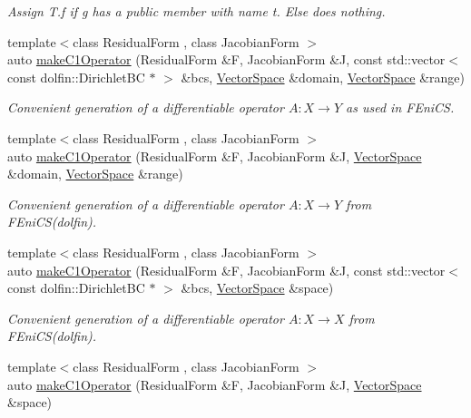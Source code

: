 \begin{DoxyCompactItemize}
\begin{DoxyCompactList}\small\item\em Assign T.\+f if g has a public member with name t. Else does nothing. \end{DoxyCompactList}\item 
{\footnotesize template$<$class Residual\+Form , class Jacobian\+Form $>$ }\\auto \hyperlink{group__FenicsGroup_ga5b21d39905318b5e3f36b71c1fb525e9_ga5b21d39905318b5e3f36b71c1fb525e9}{make\+C1\+Operator} (Residual\+Form \&F, Jacobian\+Form \&J, const std\+::vector$<$ const dolfin\+::\+Dirichlet\+B\+C $\ast$ $>$ \&bcs, \hyperlink{classSpacy_1_1VectorSpace}{Vector\+Space} \&domain, \hyperlink{classSpacy_1_1VectorSpace}{Vector\+Space} \&range)
\begin{DoxyCompactList}\small\item\em Convenient generation of a differentiable operator $A: X\rightarrow Y$ as used in F\+Eni\+C\+S. \end{DoxyCompactList}\item 
{\footnotesize template$<$class Residual\+Form , class Jacobian\+Form $>$ }\\auto \hyperlink{group__FenicsGroup_gaecd46636694770dba7c8f99325341eda_gaecd46636694770dba7c8f99325341eda}{make\+C1\+Operator} (Residual\+Form \&F, Jacobian\+Form \&J, \hyperlink{classSpacy_1_1VectorSpace}{Vector\+Space} \&domain, \hyperlink{classSpacy_1_1VectorSpace}{Vector\+Space} \&range)
\begin{DoxyCompactList}\small\item\em Convenient generation of a differentiable operator $A: X\rightarrow Y$ from F\+Eni\+C\+S(dolfin). \end{DoxyCompactList}\item 
{\footnotesize template$<$class Residual\+Form , class Jacobian\+Form $>$ }\\auto \hyperlink{group__FenicsGroup_gafc3de3603a9ac312096d742da2b5752b_gafc3de3603a9ac312096d742da2b5752b}{make\+C1\+Operator} (Residual\+Form \&F, Jacobian\+Form \&J, const std\+::vector$<$ const dolfin\+::\+Dirichlet\+B\+C $\ast$ $>$ \&bcs, \hyperlink{classSpacy_1_1VectorSpace}{Vector\+Space} \&space)
\begin{DoxyCompactList}\small\item\em Convenient generation of a differentiable operator $A: X\rightarrow X$ from F\+Eni\+C\+S(dolfin). \end{DoxyCompactList}\item 
{\footnotesize template$<$class Residual\+Form , class Jacobian\+Form $>$ }\\auto \hyperlink{group__FenicsGroup_ga508af586ecdbc9f099759ffec06e99df_ga508af586ecdbc9f099759ffec06e99df}{make\+C1\+Operator} (Residual\+Form \&F, Jacobian\+Form \&J, \hyperlink{classSpacy_1_1VectorSpace}{Vector\+Space} \&space)

\end{DoxyCompactItemize}

